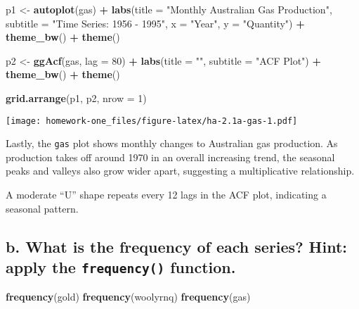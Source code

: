 \documentclass[openany]{book}
\newenvironment{Shaded}{\begin{snugshade}}{\end{snugshade}}
\newcommand{\DataTypeTok}[1]{\textcolor[rgb]{0.13,0.29,0.53}{#1}}
\newcommand{\DecValTok}[1]{\textcolor[rgb]{0.00,0.00,0.81}{#1}}
\newcommand{\KeywordTok}[1]{\textcolor[rgb]{0.13,0.29,0.53}{\textbf{#1}}}
\newcommand{\NormalTok}[1]{#1}
\newcommand{\OperatorTok}[1]{\textcolor[rgb]{0.81,0.36,0.00}{\textbf{#1}}}
\newcommand{\StringTok}[1]{\textcolor[rgb]{0.31,0.60,0.02}{#1}}
\begin{document}
\begin{Shaded}
\begin{Highlighting}[]
\NormalTok{p1 <-}\StringTok{ }\KeywordTok{autoplot}\NormalTok{(gas) }\OperatorTok{+}\StringTok{ }\KeywordTok{labs}\NormalTok{(}\DataTypeTok{title =} \StringTok{"Monthly Australian Gas Production"}\NormalTok{, }
  \DataTypeTok{subtitle =} \StringTok{"Time Series: 1956 - 1995"}\NormalTok{, }\DataTypeTok{x =} \StringTok{"Year"}\NormalTok{, }\DataTypeTok{y =} \StringTok{"Quantity"}\NormalTok{) }\OperatorTok{+}\StringTok{ }
\StringTok{  }\KeywordTok{theme_bw}\NormalTok{() }\OperatorTok{+}\StringTok{ }\KeywordTok{theme}\NormalTok{()}

\NormalTok{p2 <-}\StringTok{ }\KeywordTok{ggAcf}\NormalTok{(gas, }\DataTypeTok{lag =} \DecValTok{80}\NormalTok{) }\OperatorTok{+}\StringTok{ }\KeywordTok{labs}\NormalTok{(}\DataTypeTok{title =} \StringTok{""}\NormalTok{, }\DataTypeTok{subtitle =} \StringTok{"ACF Plot"}\NormalTok{) }\OperatorTok{+}\StringTok{ }
\StringTok{  }\KeywordTok{theme_bw}\NormalTok{() }\OperatorTok{+}\StringTok{ }\KeywordTok{theme}\NormalTok{()}

\KeywordTok{grid.arrange}\NormalTok{(p1, p2, }\DataTypeTok{nrow =} \DecValTok{1}\NormalTok{)}
\end{Highlighting}
\end{Shaded}

\texttt{[image: homework-one\_files/figure-latex/ha-2.1a-gas-1.pdf]}

Lastly, the \texttt{gas} plot shows monthly changes to Australian gas production. As production takes off around 1970 in an overall increasing trend, the seasonal peaks and valleys also grow wider apart, suggesting a multiplicative relationship.

A moderate ``U'' shape repeats every 12 lags in the ACF plot, indicating a seasonal pattern.

\hypertarget{b.-what-is-the-frequency-of-each-series-hint-apply-the-frequency-function.}{%
\subsection{\texorpdfstring{b. What is the frequency of each series? Hint: apply the \texttt{frequency()} function.}{b. What is the frequency of each series? Hint: apply the frequency() function.}}\label{b.-what-is-the-frequency-of-each-series-hint-apply-the-frequency-function.}}

\begin{Shaded}
\begin{Highlighting}[]
\KeywordTok{frequency}\NormalTok{(gold)}
\KeywordTok{frequency}\NormalTok{(woolyrnq)}
\KeywordTok{frequency}\NormalTok{(gas)}
\end{Highlighting}
\end{Shaded}
\end{document}
